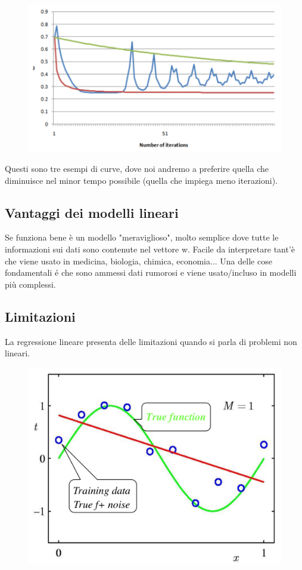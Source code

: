 \documentclass{article}
\begin{document}
\begin{figure}[H]
    \centering
    \includegraphics[scale=0.6]{Images/examplegraphloss.png}
\end{figure}

Questi sono tre esempi di curve, dove noi andremo a preferire quella che diminuisce nel minor tempo possibile (quella che impiega meno iterazioni). 

\subsection{Vantaggi dei modelli lineari}
Se funziona bene è un modello "meraviglioso", molto semplice dove tutte le informazioni sui dati sono contenute nel vettore w. Facile da interpretare tant'è che viene usato in medicina, biologia, chimica, economia... Una delle cose fondamentali é che sono ammessi dati rumorosi e viene usato/incluso in modelli più complessi.

\subsection{Limitazioni}
La regressione lineare presenta delle limitazioni quando si parla di problemi non lineari.

\begin{figure}[H]
    \centering
    \includegraphics[scale=0.4]{Images/linearnonlinear.png}
\end{figure}
\end{document}
